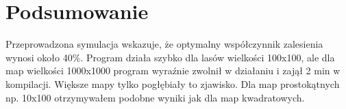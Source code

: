 \documentclass{article}
\begin{document}
\newpage

\section{Podsumowanie}
Przeprowadzona symulacja wskazuje, że optymalny współczynnik zalesienia wynosi około 40\%. Program działa szybko dla lasów wielkości 100x100, ale dla map wielkości 1000x1000 program wyraźnie zwolnił w działaniu i zajął 2 min w kompilacji. Większe mapy tylko pogłębiały to zjawisko. Dla map prostokątnych np. 10x100 otrzymywałem podobne wyniki jak dla map kwadratowych. 
\end{document}
